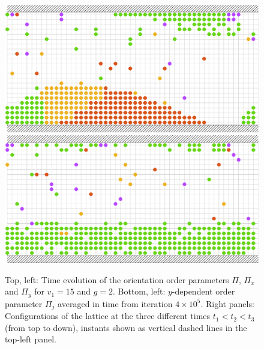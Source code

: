 \documentclass[aps,prl,twocolumn,amsmath,amssymb,superscriptaddress]{revtex4-1}
\begin{document}
\begin{figure}[h!]
\begin{minipage}{.24\textwidth}
    \includegraphics[width=\linewidth]{snap_g2_v1_15_t1.37e6}\\[4pt]
    \includegraphics[width=\linewidth]{snap_g2_v1_15_t1.6e6}
    \end{minipage}
    \caption{\label{fig:g2_v1_15}Top, left: Time evolution of the orientation order parameters $\Pi$, $\Pi_x$ and $\Pi_y$ for $v_1=15$ and $g=2$. Bottom, left: $y$-dependent order parameter $\Pi_j$ averaged in time from iteration $4\times10^5$. Right panels: Configurations of the lattice at the three different times $t_1<t_2<t_3$ (from top to down), instants shown as vertical dashed lines in the top-left panel.}
\end{figure}
\end{document}

